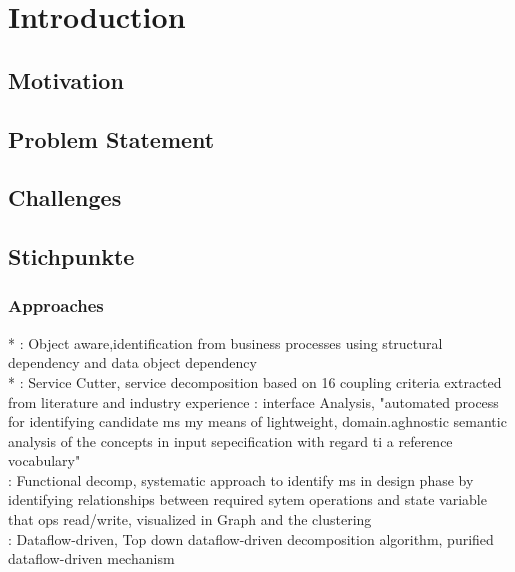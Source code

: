 
\chapter{Introduction}
\label{ch:Introduction}



\section{Motivation}
\label{sec:Introduction:Motivation}

\section{Problem Statement}
\label{sec:Introduction:ProblemStatement}

\section{Challenges}
\label{sec:Introduction:Challenges}



\section{Stichpunkte}

\subsection{Approaches}
* \cite{ObjectAwareAmiri}: Object aware,identification from business processes using structural dependency and data object dependency\\
* \cite{ServiceCutter}: Service Cutter, service decomposition based on 16 coupling criteria extracted from literature and industry experience
\cite{interfaceAnalysisBaresi}: interface Analysis,  "automated process for identifying candidate ms my means of lightweight, domain.aghnostic semantic analysis of the concepts in input sepecification with regard ti a reference vocabulary" \\
\cite{FunctionalDecompositionHeinrich} : Functional decomp, systematic approach to identify ms in design phase by identifying relationships between required sytem operations and state variable that ops read/write, visualized in Graph and the clustering\\
\cite{DataflowDrivenChen}: Dataflow-driven, Top down dataflow-driven decomposition algorithm, purified dataflow-driven mechanism


